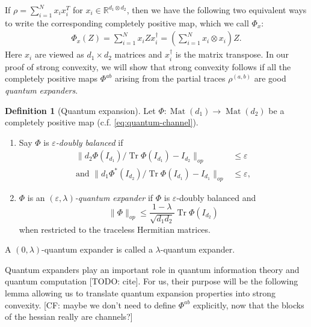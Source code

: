 \documentclass[aos]{imsart}
\theoremstyle{definition}
\newtheorem{definition}[theorem]{Definition}
\numberwithin{equation}{section}
\DeclareMathOperator{\mat}{Mat}
\DeclareMathOperator{\tr}{Tr}
\newcommand{\R}{{\mathbb{R}}}
\newcommand{\ot}{\otimes}
\newcommand{\eps}{\varepsilon}
\newcommand{\samp}{x}
\newcommand{\CF}[1]{{\color{purple}[CF: #1]}}
\newcommand{\TODO}[1]{{\color{blue}[TODO: #1]}}
\begin{document}
 
 
 If $\rho = \sum_{i = 1}^N x_i x_i^T$ for $x_i \in \R^{d_1 \ot d_2}$, then we have the following two equivalent ways to write the corresponding completely positive map, which we call $\Phi_{\samp}$:
\begin{align} \Phi_{\samp}(Z) = \sum_{i = 1}^N x_i Z x_i^\dagger = \left(\sum_{i = 1}^N x_i \ot x_i\right) Z.\label{eq:quantum-channel}\end{align}
Here $x_i$ are viewed as $d_1 \times d_2$ matrices and $x_i^\dagger$ is the matrix transpose. In our proof of strong convexity, we will show that strong convexity follows if all the completely positive maps $\Phi^{ab}$ arising from the partial traces $\rho^{(a,b)}$ are good \emph{quantum expanders}. 

\begin{definition}[Quantum expansion] Let $\Phi:\mat(d_1) \to \mat(d_2)$ be a completely positive map (c.f. \cref{eq:quantum-channel}).
\begin{enumerate}
\item Say $\Phi$ is \emph{$\eps$-doubly balanced} if
\begin{align*}
\|d_2 \Phi(I_{d_1})/\tr \Phi(I_{d_1})  - I_{d_2} \|_{op}& \leq \eps\\
\textrm{and }\|d_1 \Phi^*(I_{d_2})/\tr \Phi(I_{d_1})  - I_{d_1}  \|_{op} & \leq \eps,
\end{align*}
\item $\Phi$ is an \emph{$(\eps, \lambda)$-quantum expander} if $\Phi$ is $\eps$-doubly balanced and
$$\|\Phi\|_{op} \leq \frac{1-\lambda}{\sqrt{d_1d_2}} \tr \Phi(I_{d_2})$$
when restricted to the traceless Hermitian matrices.
\end{enumerate}
A $(0, \lambda)$-quantum expander is called a $\lambda$-quantum expander.
\end{definition}





Quantum expanders play an important role in quantum information theory and quantum computation \TODO{cite}. For us, their purpose will be the following lemma allowing us to translate quantum expansion properties into strong convexity. \CF{maybe we don't need to define $\Phi^{ab}$ explicitly, now that the blocks of the hessian really are channels?}
\end{document}
